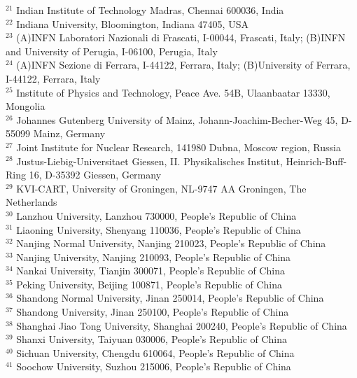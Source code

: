 \begin{small}
\begin{center}
{$^{21}$ Indian Institute of Technology Madras, Chennai 600036, India\\
$^{22}$ Indiana University, Bloomington, Indiana 47405, USA\\
$^{23}$ (A)INFN Laboratori Nazionali di Frascati, I-00044, Frascati, Italy; (B)INFN and University of Perugia, I-06100, Perugia, Italy\\
$^{24}$ (A)INFN Sezione di Ferrara, I-44122, Ferrara, Italy; (B)University of Ferrara, I-44122, Ferrara, Italy\\
$^{25}$ Institute of Physics and Technology, Peace Ave. 54B, Ulaanbaatar 13330, Mongolia\\
$^{26}$ Johannes Gutenberg University of Mainz, Johann-Joachim-Becher-Weg 45, D-55099 Mainz, Germany\\
$^{27}$ Joint Institute for Nuclear Research, 141980 Dubna, Moscow region, Russia\\
$^{28}$ Justus-Liebig-Universitaet Giessen, II. Physikalisches Institut, Heinrich-Buff-Ring 16, D-35392 Giessen, Germany\\
$^{29}$ KVI-CART, University of Groningen, NL-9747 AA Groningen, The Netherlands\\
$^{30}$ Lanzhou University, Lanzhou 730000, People's Republic of China\\
$^{31}$ Liaoning University, Shenyang 110036, People's Republic of China\\
$^{32}$ Nanjing Normal University, Nanjing 210023, People's Republic of China\\
$^{33}$ Nanjing University, Nanjing 210093, People's Republic of China\\
$^{34}$ Nankai University, Tianjin 300071, People's Republic of China\\
$^{35}$ Peking University, Beijing 100871, People's Republic of China\\
$^{36}$ Shandong Normal University, Jinan 250014, People's Republic of China\\
$^{37}$ Shandong University, Jinan 250100, People's Republic of China\\
$^{38}$ Shanghai Jiao Tong University, Shanghai 200240, People's Republic of China\\
$^{39}$ Shanxi University, Taiyuan 030006, People's Republic of China\\
$^{40}$ Sichuan University, Chengdu 610064, People's Republic of China\\
$^{41}$ Soochow University, Suzhou 215006, People's Republic of China\\
}
\end{center}
\end{small}
